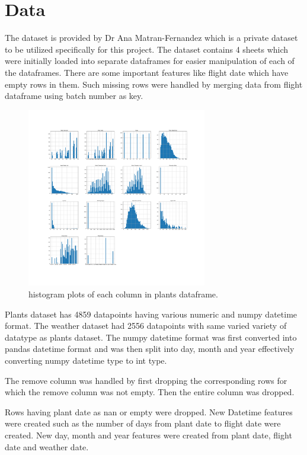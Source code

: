 \documentclass{article}
\begin{document}
\section{Data}
The dataset is provided by Dr Ana Matran-Fernandez which is a private dataset to be utilized specifically for this project. The dataset contains 4 sheets which were initially loaded into separate dataframes for easier manipulation of each of the dataframes. There are some important features like flight date which have empty rows in them. Such missing rows were handled by merging data from flight dataframe using batch number as key.   

\begin{figure}[tb]
\centering
\includegraphics[width=0.7\textwidth]{plants_hist.pdf}
\caption{\label{fig:plants_hist}histogram plots of each column in plants dataframe.}
\end{figure}

Plants dataset has 4859 datapoints having various numeric and numpy datetime format. The weather dataset had 2556 datapoints with same varied variety of datatype as plants dataset. The numpy datetime format was first converted into pandas datetime format and was then split into day, month and year effectively converting numpy datetime type to int type.   

  

The remove column was handled by first dropping the corresponding rows for which the remove column was not empty. Then the entire column was dropped.  

  

Rows having plant date as nan or empty were dropped. New Datetime features were created such as the number of days from plant date to flight date were created. New day, month and year features were created from plant date, flight date and weather date.   
\end{document}
